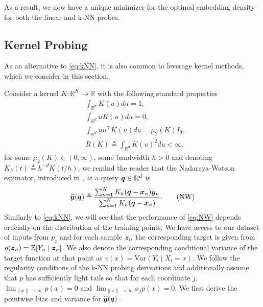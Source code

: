 As a result, we now have a unique minimizer for the optimal embedding density for both the linear and k-NN probes.














\subsection{Kernel Probing}

As an alternative to \eqref{eq:kNN}, it is also common to leverage kernel methods, which we consider in this section.


Consider a kernel $K:\mathbb{R}^K\to\mathbb{R}$ with the following standard properties
\begin{align}
    &\int_{\mathbb{R}^d} K(u)du=1,\tag{normalized}\\
    &\int_{\mathbb{R}^d} uK(u)du=0,\tag{symmetric}\\
    &\int_{\mathbb{R}^d} u u^\top K(u)du=\mu_2(K)I_d,\tag{isotropic}\\
    &R(K)\triangleq\int_{\mathbb{R}^d} K(u)^2du<\infty,\tag{finite roughness}
\end{align}
for some $\mu_2(K)\in(0,\infty)$, some bandwidth $h>0$ and denoting $K_h(t)\triangleq h^{-d}K(t/h)$, we remind the reader that the Nadaraya-Watson estimator, introduced in \citet{nadaraya1964estimating,watson1964smooth}, at a query ${\bm{q}}\in\mathbb{R}^d$ is
\begin{align}
\widehat {{\bm{y}}}({\bm{q}})\triangleq \frac{\sum_{n=1}^N K_h({\bm{q}}-{\bm{x}}_n){\bm{y}}_n}{\sum_{n=1}^N K_h({\bm{q}}-{\bm{x}}_n)}.\tag{NW}\label{eq:NW}
\end{align}
Similarly to \eqref{eq:kNN}, we will see that the performance of \eqref{eq:NW} depends crucially on the distribution of the training points. We have access to our dataset of inputs from $p_z$ and for each sample ${\bm{z}}_n$ the corresponding target is given from $\eta({\bm{z}}_n)=\mathbb{E}[Y_n\mid {\bm{z}}_n]$. We also denote the corresponding conditional variance of the target function at that point as $v(x)=\mathrm{Var}(Y_i\mid X_i=x)$. We follow the regularity conditions of the k-NN probing derivations and additionally assume that $p$ has sufficiently light tails so that for each coordinate $j$, $\lim_{\|x\|\to\infty} p(x)=0$ and $\lim_{\|x\|\to\infty} x_jp(x)=0$. We first derive the pointwise bias and variance for $\widehat {{\bm{y}}}({\bm{q}})$.


